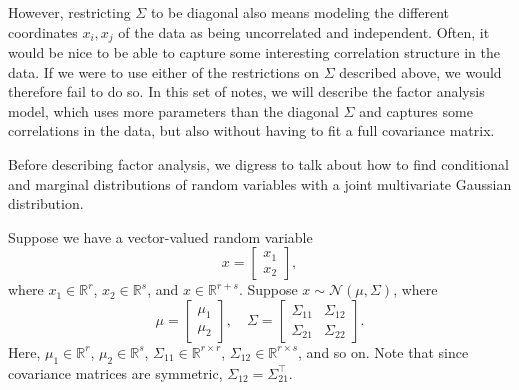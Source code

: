 However, restricting $\Sigma$ to be diagonal also means modeling the different
coordinates $x_i, x_j$ of the data as being uncorrelated and independent. Often,
it would be nice to be able to capture some interesting correlation structure
in the data. If we were to use either of the restrictions on $\Sigma$ described above,
we would therefore fail to do so. In this set of notes, we will describe the
factor analysis model, which uses more parameters than the diagonal $\Sigma$ and
captures some correlations in the data, but also without having to fit a full
covariance matrix.

\vspace{1cm}
\begin{fullwidth}
\end{fullwidth}
Before describing factor analysis, we digress to talk about how to find conditional and marginal distributions of random variables with a joint multivariate Gaussian distribution.

Suppose we have a vector-valued random variable
\[
x =
\begin{bmatrix}
    x_1\\
    x_2
\end{bmatrix},
\]
where $x_1 \in \mathbb R^r$, $x_2 \in \mathbb R^s$, and $x \in \mathbb R^{r+s}$.
Suppose $x \sim \mathcal N(\mu , \Sigma)$, where
\[
    \mu = \begin{bmatrix}
        \mu_1\\
        \mu_2        
    \end{bmatrix}
    ,
    \quad
    \Sigma = \begin{bmatrix}
        \Sigma_{11} & \Sigma_{12}\\
        \Sigma_{21} & \Sigma_{22}        
    \end{bmatrix}.
\]
Here, $\mu_1 \in \mathbb R^r$, $\mu_2 \in \mathbb R^s$, $\Sigma_{11} \in \mathbb R^{r \times r}$,
$\Sigma_{12} \in \mathbb R^{r \times s}$, and so on. Note that since
covariance matrices are symmetric, $\Sigma_{12} = \Sigma^\top_{21}$.

